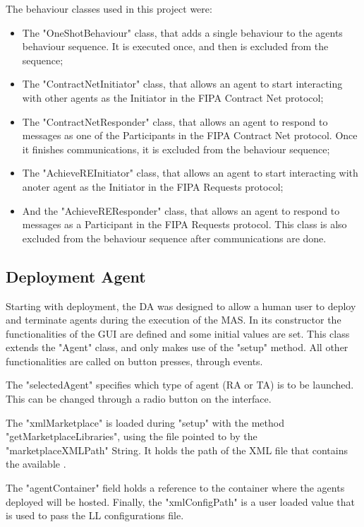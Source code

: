 The behaviour classes used in this project were:
\begin{itemize}
	\item The "OneShotBehaviour" class, that adds a single behaviour to the agents behaviour sequence. It is executed once, and then is excluded from the sequence;
	\item The "ContractNetInitiator" class, that allows an agent to start interacting with other agents as the Initiator in the \acrshort{FIPA} Contract Net protocol;
	\item The "ContractNetResponder" class, that allows an agent to respond to messages as one of the Participants in the \acrshort{FIPA} Contract Net protocol. Once it finishes communications, it is excluded from the behaviour sequence;
	\item The "AchieveREInitiator" class, that allows an agent to start interacting with anoter agent as the Initiator in the \acrshort{FIPA} Requests protocol;
	\item And the "AchieveREResponder" class, that allows an agent to respond to messages as a Participant in the \acrshort{FIPA} Requests protocol. This class is also excluded from the behaviour sequence after communications are done.
\end{itemize}

\subsection{Deployment Agent}
\label{subsec:deployment_agent}

Starting with deployment, the \acrlong{DA} was designed to allow a human user to deploy and terminate agents during the execution of the \acrshort{MAS}. In its constructor the functionalities of the \acrshort{GUI} are defined and some initial values are set. This class extends the "Agent" class, and only makes use of the "setup" method. All other functionalities are called on button presses, through events.

The "selectedAgent" specifies which type of agent (\acrshort{RA} or \acrshort{TA}) is to be launched. This can be changed through a radio button on the interface.

The "xmlMarketplace" is loaded during "setup" with the method "getMarketplaceLibraries", using the file pointed to by the "marketplaceXMLPath" String. It holds the path of the \acrshort{XML} file that contains the available .

The "agentContainer" field holds a reference to the container where the agents deployed will be hosted. Finally, the "xmlConfigPath" is a user loaded value that is used to pass the \acrshort{LL} configurations file.\\

